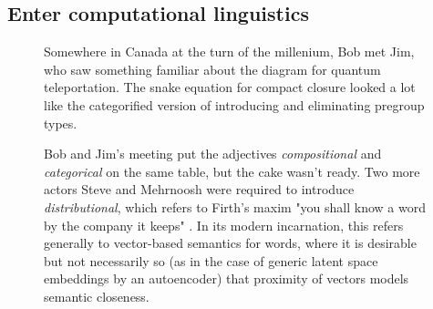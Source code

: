 \subsection{Enter computational linguistics}

\begin{figure}[h!]
\centering
{}
\caption{Somewhere in Canada at the turn of the millenium, Bob met Jim, who saw something familiar about the diagram for quantum teleportation. The snake equation for compact closure looked a lot like the categorified version of introducing and eliminating pregroup types.
}
\end{figure}

\begin{figure}[h!]
\centering
{}
\caption{Bob and Jim's meeting put the adjectives \emph{compositional} and \emph{categorical} on the same table, but the cake wasn't ready. Two more actors Steve and Mehrnoosh were required to introduce \emph{distributional}, which refers to Firth's maxim "you shall know a word by the company it keeps" \citep{firth_studies_1957}. In its modern incarnation, this refers generally to vector-based semantics for words, where it is desirable but not necessarily so (as in the case of generic latent space embeddings by an autoencoder) that proximity of vectors models semantic closeness.}
\end{figure}

